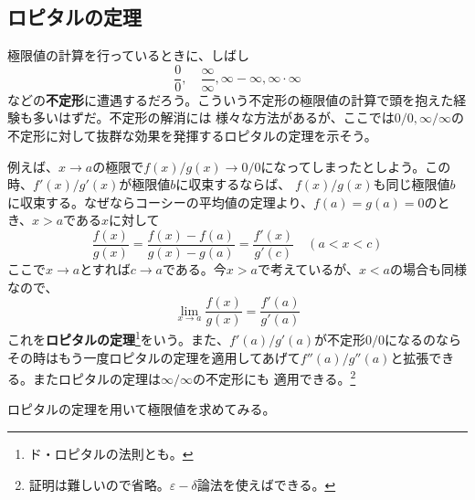 \documentclass[a4j,dvipdfmx]{jsarticle}
\begin{document}
                \clearpage
                \subsection{ロピタルの定理}
                    極限値の計算を行っているときに、しばし
                    \begin{equation*}
                        \frac{0}{0},\quad\frac{\infty}{\infty},\infty -\infty,\infty\cdot\infty
                    \end{equation*}
                    などの\textbf{不定形}に遭遇するだろう。こういう不定形の極限値の計算で頭を抱えた経験も多いはずだ。不定形の解消には
                    様々な方法があるが、ここでは$0/0,\infty/\infty$の不定形に対して抜群な効果を発揮するロピタルの定理を示そう。
                    
                    例えば、$x\to a$の極限で$f(x)/g(x)\to 0/0$になってしまったとしよう。この時、$f'(x)/g'(x)$が極限値$b$に収束するならば、
                    $f(x)/g(x)$も同じ極限値$b$に収束する。なぜならコーシーの平均値の定理より、$f(a)=g(a)=0$のとき、$x>a$である$x$に対して
                    \begin{equation*}
                        \frac{f(x)}{g(x)}=\frac{f(x)-f(a)}{g(x)-g(a)}=\frac{f'(x)}{g'(c)}\quad(a<x<c)
                    \end{equation*}
                    ここで$x\to a$とすれば$c\to a$である。今$x>a$で考えているが、$x<a$の場合も同様なので、
                    \begin{equation}
                        \lim_{x\to a}\frac{f(x)}{g(x)}=\frac{f'(a)}{g'(a)}\label{ロピタルの定理}
                    \end{equation}
                    これを\textbf{ロピタルの定理}\footnote{ド・ロピタルの法則とも。}をいう。また、$f'(a)/g'(a)$が不定形$0/0$になるのなら
                    その時はもう一度ロピタルの定理を適用してあげて$f''(a)/g''(a)$と拡張できる。またロピタルの定理は$\infty/\infty$の不定形にも
                    適用できる。\footnote{証明は難しいので省略。$\varepsilon-\delta$論法を使えばできる。}

                    ロピタルの定理を用いて極限値を求めてみる。
\end{document}
